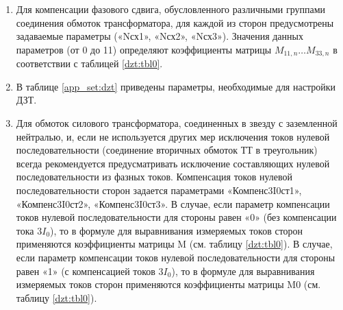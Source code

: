 \begin{enumerate}
\begin{enumerate}
\item 
Для компенсации фазового сдвига, обусловленного различными группами соединения обмоток трансформатора, для каждой из сторон предусмотрены задаваемые параметры («Nсх1», «Nсх2», «Nсх3»). Значения данных параметров (от 0 до 11) определяют коэффициенты матрицы $M_{11,n}\dots M_{33,n}$ в соответствии с таблицей \ref{dzt:tbl0}.

\item 
В таблице \ref{app_set:dzt} приведены параметры, необходимые для настройки ДЗТ.

\item 
Для обмоток силового трансформатора, соединенных в звезду с заземленной нейтралью, и, если не используется других мер исключения токов нулевой последовательности (соединение вторичных обмоток ТТ в треугольник) всегда рекомендуется предусматривать исключение составляющих нулевой последовательности из фазных токов. Компенсация токов нулевой последовательности сторон задается параметрами «Компенс3I0ст1», «Компенс3I0ст2», «Компенс3I0ст3». В случае, если параметр компенсации токов нулевой последовательности для стороны равен «0» (без компенсации тока $3I_0$), то в формуле для выравнивания измеряемых токов сторон применяются коэффициенты матрицы M (см. таблицу \ref{dzt:tbl0}). В случае, если параметр компенсации токов нулевой последовательности для стороны равен «1» (с компенсацией токов $3I_0$), то в формуле для выравнивания измеряемых токов сторон применяются коэффициенты матрицы M0 (см. таблицу \ref{dzt:tbl0}).

\small
\renewcommand{\arraystretch}{0.8}  %

\newcommand{\mymatrix}[1]{%
  \raisebox{15pt}{\ensuremath{#1}}%
}



\end{enumerate}
\end{enumerate}
